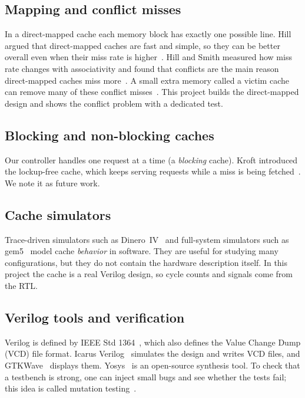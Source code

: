 \documentclass[conference]{IEEEtran}
\begin{document}
\subsection{Mapping and conflict misses}
In a direct-mapped cache each memory block has exactly one possible line. Hill argued that direct-mapped caches are fast and simple, so they can be better overall even when their miss rate is higher~\cite{hill1988}. Hill and Smith measured how miss rate changes with associativity and found that conflicts are the main reason direct-mapped caches miss more~\cite{hillsmith1989}. A small extra memory called a victim cache can remove many of these conflict misses~\cite{jouppi1990}. This project builds the direct-mapped design and shows the conflict problem with a dedicated test.

\subsection{Blocking and non-blocking caches}
Our controller handles one request at a time (a \emph{blocking} cache). Kroft introduced the lockup-free cache, which keeps serving requests while a miss is being fetched~\cite{kroft1981}. We note it as future work.

\subsection{Cache simulators}
Trace-driven simulators such as Dinero~IV~\cite{dinero} and full-system simulators such as gem5~\cite{gem5} model cache \emph{behavior} in software. They are useful for studying many configurations, but they do not contain the hardware description itself. In this project the cache is a real Verilog design, so cycle counts and signals come from the RTL.

\subsection{Verilog tools and verification}
Verilog is defined by IEEE Std 1364~\cite{verilog2005}, which also defines the Value Change Dump (VCD) file format. Icarus Verilog~\cite{iverilog} simulates the design and writes VCD files, and GTKWave~\cite{gtkwave} displays them. Yosys~\cite{yosys} is an open-source synthesis tool. To check that a testbench is strong, one can inject small bugs and see whether the tests fail; this idea is called mutation testing~\cite{demillo1978}.

\end{document}
